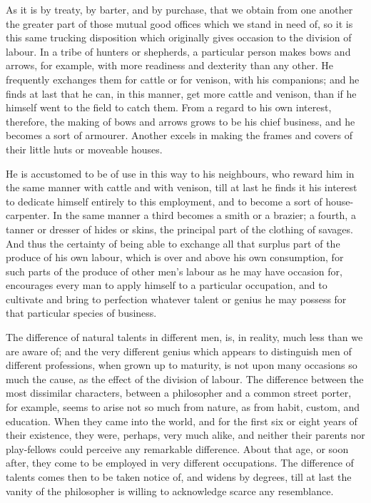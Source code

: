 As it is by treaty, by barter, and by purchase, that we obtain from one another the greater part of those mutual good offices which we stand in need of, so it is this same trucking disposition which originally gives occasion to the division of labour. In a tribe of hunters or shepherds, a particular person makes bows and arrows, for example, with more readiness and dexterity than any other. He frequently exchanges them for cattle or for venison, with his companions; and he finds at last that he can, in this manner, get more cattle and venison, than if he himself went to the field to catch them. From a regard to his own interest, therefore, the making of bows and arrows grows to be his chief business, and he becomes a sort of armourer. Another excels in making the frames and covers of their little huts or moveable houses.\par

He is accustomed to be of use in this way to his neighbours, who reward him in the same manner with cattle and with venison, till at last he finds it his interest to dedicate himself entirely to this employment, and to become a sort of house-carpenter. In the same manner a third becomes a smith or a brazier; a fourth, a tanner or dresser of hides or skins, the principal part of the clothing of savages. And thus the certainty of being able to exchange all that surplus part of the produce of his own labour, which is over and above his own consumption, for such parts of the produce of other men’s labour as he may have occasion for, encourages every man to apply himself to a particular occupation, and to cultivate and bring to perfection whatever talent or genius he may possess for that particular species of business.\par

The difference of natural talents in different men, is, in reality, much less than we are aware of; and the very different genius which appears to distinguish men of different professions, when grown up to maturity, is not upon many occasions so much the cause, as the effect of the division of labour. The difference between the most dissimilar characters, between a philosopher and a common street porter, for example, seems to arise not so much from nature, as from habit, custom, and education. When they came into the world, and for the first six or eight years of their existence, they were, perhaps, very much alike, and neither their parents nor play-fellows could perceive any remarkable difference. About that age, or soon after, they come to be employed in very different occupations. The difference of talents comes then to be taken notice of, and widens by degrees, till at last the vanity of the philosopher is willing to acknowledge scarce any resemblance.\par

